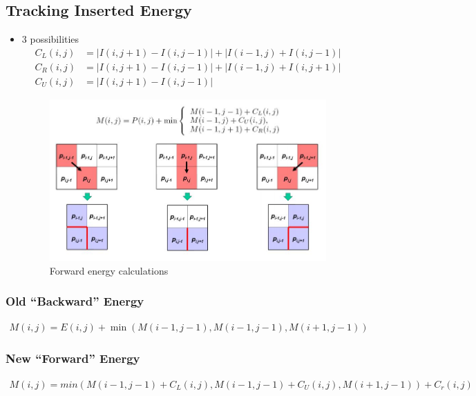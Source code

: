 \documentclass[letterpaper,12pt]{article}
\newcommand{\abs}[1]{\lvert#1\rvert}
\begin{document}
\subsection{Tracking Inserted Energy}
\begin{itemize}
 \item 3 possibilities
       \begin{align}
        C_L(i,j) & = \abs{I(i,j+1) - I(i,j-1)} + \abs{I(i-1,j) + I(i, j-1)} \\
        C_R(i,j) & = \abs{I(i,j+1) - I(i,j-1)} + \abs{I(i-1,j) + I(i, j+1)} \\
        C_U(i,j) & = \abs{I(i,j+1) - I(i,j-1)}
       \end{align}
       \begin{figure}
        \centering
        \includegraphics[width=15cm]{images/forward_energy_calculation.jpg}
        \caption{Forward energy calculations}
       \end{figure}
\end{itemize}

\subsubsection{Old ``Backward'' Energy}
\begin{align}
 M(i,j) = E(i,j) + \min(M(i-1, j-1), M(i-1, j-1), M(i+1, j-1))
\end{align}

\subsubsection{New ``Forward'' Energy}
\begin{align}
 M(i,j) = min(M(i-1, j-1) + C_L(i,j), M(i-1, j-1) + C_U(i,j), M(i+1, j-1)) + C_r(i,j)
\end{align}
\end{document}
